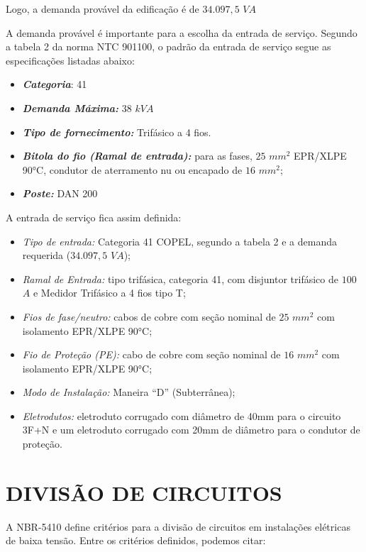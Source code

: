 Logo, a demanda provável da edificação é de $34.097,5$ $VA$

A demanda provável é importante para a escolha da entrada de serviço. Segundo a tabela 2 da norma NTC 901100, o padrão da entrada de serviço segue as especificações listadas abaixo:

\begin{itemize}
	\item \textbf{\textit{Categoria}}: 41
	\item \textbf{\textit{Demanda Máxima:}} $38$ $kVA$
	\item \textbf{\textit{Tipo de fornecimento:}} Trifásico a 4 fios.
	\item \textbf{\textit{Bitola do fio (Ramal de entrada):}} para as fases, $25$ $mm^2$ EPR/XLPE 90°C,  condutor de aterramento nu ou encapado de $16$ $mm^2$;
	\item \textbf{\textit{Poste: }}DAN 200
\end{itemize}

A entrada de serviço fica assim definida:

\begin{itemize}
	\item \textit{Tipo de entrada:} Categoria 41 COPEL, segundo a tabela 2 e a demanda requerida ($34.097,5$ $VA$);
	\item \textit{Ramal de Entrada:} tipo trifásica, categoria 41, com disjuntor trifásico de $100$ $A$ e Medidor Trifásico a 4 fios tipo T;
	\item \textit{Fios de fase/neutro:} cabos de cobre com seção nominal de $25$ $mm^2$ com isolamento EPR/XLPE 90°C;
	\item \textit{Fio de Proteção (PE):} cabo de cobre com seção nominal de $16$ $mm^2$ com isolamento EPR/XLPE 90°C;
	\item \textit{Modo de Instalação:} Maneira ``D'' (Subterrânea);
	\item \textit{Eletrodutos: } eletroduto corrugado com diâmetro de 40mm para o circuito 3F+N e um eletroduto corrugado com 20mm de diâmetro para o condutor de proteção.
\end{itemize}

\section{DIVISÃO DE CIRCUITOS}

A NBR-5410 define critérios para a divisão de circuitos em instalações elétricas de baixa tensão. Entre os critérios definidos, podemos citar:

